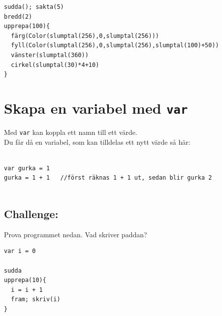   

\begin{lstlisting}[basicstyle={\ttfamily\fontsize{16}{19}\selectfont},numbers=none]
sudda(); sakta(5)
bredd(2)
upprepa(100){
  färg(Color(slumptal(256),0,slumptal(256)))
  fyll(Color(slumptal(256),0,slumptal(256),slumptal(100)+50))
  vänster(slumptal(360))
  cirkel(slumptal(30)*4+10)
}
\end{lstlisting}
        
\chapter{Skapa en variabel med \lstinline{var}}Med \lstinline{var} kan koppla ett namn till ett värde.\\
Du får då en variabel, som kan tilldelas ett nytt värde så här:

\begin{lstlisting}[numbers=none]

var gurka = 1
gurka = 1 + 1   //först räknas 1 + 1 ut, sedan blir gurka 2        
        
\end{lstlisting}
        
\section*{\color{BrickRed}Challenge:}
Prova programmet nedan. Vad skriver paddan?

\begin{lstlisting}[basicstyle={\ttfamily\fontsize{16}{19}\selectfont},numbers=none]
var i = 0

sudda
upprepa(10){
  i = i + 1
  fram; skriv(i)
}
\end{lstlisting}
        
